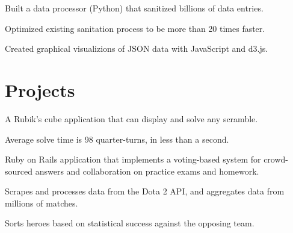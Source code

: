 \documentclass[letterpaper]{kevin-resume}
\begin{document}
\begin{minipage}[t]{0.8\textwidth}

\begin{tightitemize}
\item Built a data processor (Python) that sanitized billions of data entries.
\item Optimized existing sanitation process to be more than 20 times faster.
\item Created graphical visualizions of JSON data with JavaScript and d3.js.
\end{tightitemize}
\sectionspace %

\section{Projects}

\begin{tightitemize}
\item A Rubik's cube application that can display and solve any scramble.
\item Average solve time is 98 quarter-turns, in less than a second.
\end{tightitemize}
\sectionspace

\begin{tightitemize}
\item Ruby on Rails application that implements a voting-based system for crowd-sourced answers and collaboration on practice exams and homework.
\end{tightitemize}
\sectionspace

\begin{tightitemize}
\item Scrapes and processes data from the Dota 2 API, and aggregates data from millions of matches.
\item Sorts heroes based on statistical success against the opposing team.
\end{tightitemize}
\sectionspace


\end{minipage}
\end{document}
